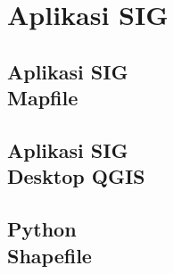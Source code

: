 \documentclass{WileySix}
\begin{document}
\part[Aplikasi SIG]
{Aplikasi SIG}

\chapter[Mapfile]
{Aplikasi SIG\\ Mapfile}


\chapter[QGIS]
{Aplikasi SIG\\ Desktop QGIS}


\chapter[Python Shapefile]
{Python\\ Shapefile}










\printindex
\end{document}
